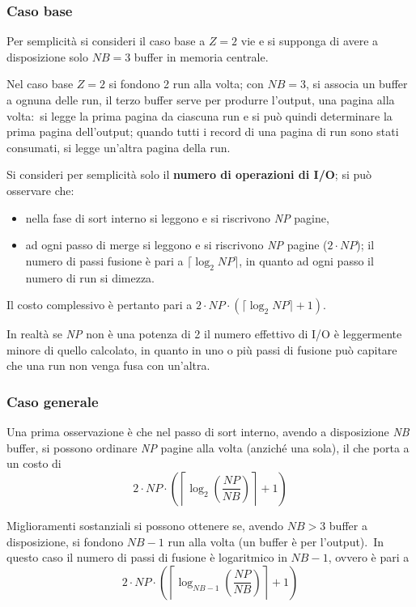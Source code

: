 \subsubsection{Caso base}
Per semplicità si consideri il caso base a $Z = 2$ vie e si supponga di avere a disposizione solo $\mathit{NB} = 3$ buffer in memoria centrale.\

Nel caso base $Z = 2$ si fondono 2 run alla volta; con $\mathit{NB} = 3$, si associa un buffer a ognuna delle run, il terzo buffer serve per produrre l'output, una pagina alla volta:\ si legge la prima pagina da ciascuna run e si può quindi determinare la prima pagina dell'output; quando tutti i record di una pagina di run sono stati consumati, si legge un'altra pagina della run.

Si consideri per semplicità solo il \textbf{numero di operazioni di I/O}; si può osservare che:\
\begin{itemize}
	\item nella fase di sort interno si leggono e si riscrivono \textit{NP} pagine,
	\item ad ogni passo di merge si leggono e si riscrivono \textit{NP} pagine ($2 \cdot \mathit{NP}$); il numero di passi fusione è pari a $\lceil \log_2\mathit{NP}\rceil$, in quanto ad ogni passo il numero di run si dimezza.
\end{itemize}

\noindent Il costo complessivo è pertanto pari a $2 \cdot \mathit{NP} \cdot \left(\lceil\log_2\mathit{NP}\rceil + 1\right)$.

\noindent In realtà se \textit{NP} non è una potenza di 2 il numero effettivo di I/O è leggermente minore di quello calcolato, in quanto in uno o più passi di fusione può capitare che una run non venga fusa con un'altra.

\subsubsection{Caso generale}

Una prima osservazione è che nel passo di sort interno, avendo a disposizione \textit{NB} buffer, si possono ordinare \textit{NP} pagine alla volta (anziché una sola), il che porta a un costo di \[2 \cdot \mathit{NP} \cdot \left(\left\lceil\log_2\left(\frac{\mathit{NP}}{\mathit{NB}}\right)\right\rceil+ 1\right)\]

\noindent Miglioramenti sostanziali si possono ottenere se, avendo $\mathit{NB} > 3$ buffer a disposizione, si fondono $\mathit{NB} - 1$ run alla volta (un buffer è per l'output).\
In questo caso il numero di passi di fusione è logaritmico in $\mathit{NB} - 1$, ovvero è pari a \[2 \cdot \mathit{NP} \cdot \left(\left\lceil\log_{\mathit{NB}-1}\left(\frac{\mathit{NP}}{\mathit{NB}}\right)\right\rceil+ 1\right)\]

